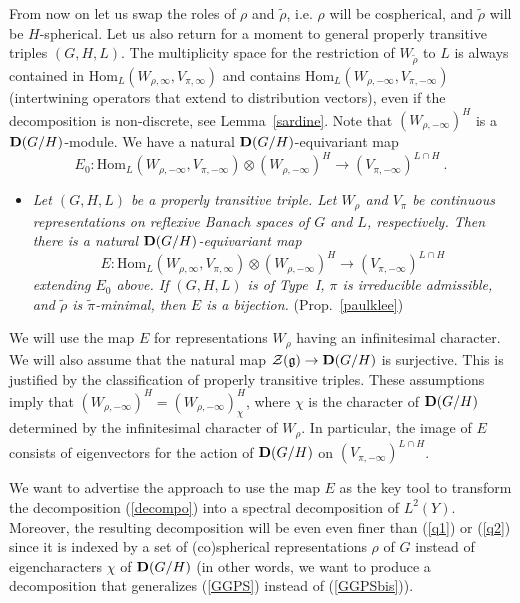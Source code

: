 \documentclass[10]{amsart}
\theoremstyle{remark}
\theoremstyle{definition}
\numberwithin{equation}{section}
\newcommand{\Hom}{\mathrm{Hom}}
\newcommand{\fg}{{\mathfrak g}}
\newcommand{\Cal}{\mathcal}
\newcommand{\be}{\begin{equation}}
\begin{document}
From now on let us swap the roles of $\rho$ and $\tilde\rho$, i.e. $\rho$ will be cospherical, and $\tilde \rho$ will be $H$-spherical. Let us also return for a moment to 
general
properly transitive triples $(G,H,L)$. The multiplicity space for the restriction of $W_{\tilde\rho}$ to $L$ is always contained in $\Hom_L(W_{\rho,\infty}, V_{\pi,\infty})$ and contains $\Hom_L(W_{\rho,-\infty}, V_{\pi,-\infty})$ (intertwining operators that extend to distribution vectors),
even if the decomposition is non-discrete, see Lemma~\ref{sardine}. Note that $(W_{\rho,-\infty})^H$ is a ${\bf D}(G/H)$-module. We have a natural ${\bf D}(G/H)$-equivariant map
$$ E_0: \Hom_L(W_{\rho,-\infty}, V_{\pi,-\infty})\otimes (W_{\rho,-\infty})^H\longrightarrow (V_{\pi,-\infty})^{L\cap H}\ .$$
\begin{itemize}
\item[({\bf J})] {\em Let $(G,H,L)$ be a properly transitive triple. Let $W_\rho$ and $V_\pi$ be continuous representations on reflexive Banach spaces of $G$ and $L$, respectively.
Then there is a natural ${\bf D}(G/H)$-equivariant map 
\be\label{thomas1}\nonumber   E: \Hom_L(W_{\rho,\infty},V_{\pi,\infty})\otimes (W_{\rho,-\infty})^H\longrightarrow  (V_{\pi,-\infty})^{L\cap H}
\end{equation}
extending $E_0$ above. If $(G,H,L)$ is of Type~I, $\pi$ is irreducible admissible, and $\tilde\rho$ is $\tilde\pi$-minimal, then $E$ is a bijection.} (Prop.~\ref{paulklee})
\end{itemize}
We will use the map $E$ for representations $W_\rho$ having an infinitesimal character. We will also assume that the natural map ${\Cal Z}(\fg)\rightarrow {\bf D}(G/H)$ is surjective.
This is justified by the classification of properly transitive triples. These assumptions imply that $(W_{\rho,-\infty})^H=(W_{\rho,-\infty})_\chi^H$, where $\chi$ is the character of ${\bf D}(G/H)$ determined by the infinitesimal character of $W_\rho$. In particular, the image of $E$ consists of eigenvectors for the action of ${\bf D}(G/H)$ on  $(V_{\pi,-\infty})^{L\cap H}$.

We want to advertise the approach to use the map $E$ as the key tool to transform the decomposition (\ref{decompo})
into a spectral decomposition of $L^2(Y)$. Moreover, the resulting decomposition will be even even finer than (\ref{q1}) or (\ref{q2}) since it is indexed by  a set of (co)spherical representations $\rho$ of $G$ instead of eigencharacters $\chi$ of 
${\bf D}(G/H)$ (in other words, we want to produce a decomposition that generalizes (\ref{GGPS}) instead of (\ref{GGPSbis})).
\end{document}
